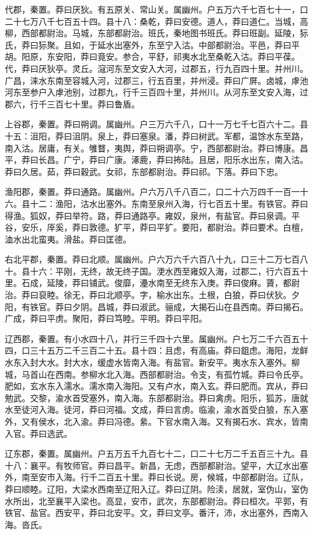 \documentclass[]{article}
\begin{document}
代郡，秦置。莽曰厌狄。有五原关、常山关。属幽州。户五万六千七百七十一，口二十七万八千七百五十四。县十八：桑乾，莽曰安德。道人，莽曰道仁。当城，高柳，西部都尉治。马城，东部都尉治。班氏，秦地图书班氏。莽曰班副。延陵，狋氏，莽曰狋聚。且如，于延水出塞外，东至宁入沽。中部都尉治。平邑，莽曰平胡。阳原，东安阳，莽曰竟安。参合，平舒，祁夷水北至桑乾入沽。莽曰平葆。代，莽曰厌狄亭。灵丘。滱河东至文安入大河，过郡五，行九百四十里。并州川。广昌，涞水东南至容城入河，过郡三，行五百里，并州浸。莽曰广屏。卤城，虖池河东至参户入虖池别，过郡九，行千三百四十里，并州川。从河东至文安入海，过郡六，行千三百七十里。莽曰鲁盾。

上谷郡，秦置。莽曰朔调。属幽州。户三万六千八，口十一万七千七百六十二。县十五：沮阳，莽曰沮阴。泉上，莽曰塞泉。潘，莽曰树武。军都，温馀水东至路，南入沽。居庸，有关。雊瞀，夷舆，莽曰朔调亭。宁，西部都尉治。莽曰博康。昌平，莽曰长昌。广宁，莽曰广康。涿鹿，莽曰抪陆。且居，阳乐水出东，南入沽。莽曰久居。茹，莽曰穀武。女祁，东部都尉治。莽曰祁。下落。莽曰下忠。

渔阳郡，秦置。莽曰通路。属幽州。户六万八千八百二，口二十六万四千一百一十六。县十二：渔阳，沽水出塞外。东南至泉州入海，行七百五十里。有铁官。莽曰得渔。狐奴，莽曰举符。路，莽曰通路亭。雍奴，泉州，有盐官。莽曰泉调。平谷，安乐，厗奚，莽曰敦德。犷平，莽曰平犷。要阳，都尉治。莽曰要术。白檀，洫水出北蛮夷。滑盐。莽曰匡德。

右北平郡，秦置。莽曰北顺。属幽州。户六万六千六百八十九，口三十二万七百八十。县十六：平刚，无终，故无终子国。浭水西至雍奴入海，过郡二，行六百五十里。石成，延陵，莽曰铺武。俊靡，灅水南至无终东入庚。莽曰俊麻。薋，都尉治。莽曰裒睦。徐无，莽曰北顺亭。字，榆水出东。土根，白狼，莽曰伏狄。夕阳，有铁官。莽曰夕阴。昌城，莽曰淑武。骊成，大揭石山在县西南。莽曰揭石。广成，莽曰平虏。聚阳，莽曰笃睦。平明。莽曰平阳。

辽西郡，秦置。有小水四十八，并行三千四十六里。属幽州。户七万二千六百五十四，口三十五万二千三百二十五。县十四：且虑，有高庙。莽曰鉏虑。海阳，龙鲜水东入封大水。封大水，缓虚水皆南入海。有盐官。新安平。夷水东入塞外。柳城，马首山在西南。参柳水北入海。西部都尉治。令支，有孤竹城。莽曰令氏亭。肥如，玄水东入濡水。濡水南入海阳。又有卢水，南入玄。莽曰肥而。宾从，莽曰勉武。交黎，渝水首受塞外，南入海。东部都尉治。莽曰禽虏。阳乐，狐苏，唐就水至徒河入海。徒河，莽曰河福。文成，莽曰言虏。临渝，渝水首受白狼，东入塞外，又有侯水，北入渝。莽曰冯德。絫。下官水南入海。又有揭石水、宾水，皆南入官。莽曰选武。

辽东郡，秦置。属幽州。户五万五千九百七十二，口二十七万二千五百三十九。县十八：襄平。有牧师官。莽曰昌平。新昌，无虑，西部都尉治。望平，大辽水出塞外，南至安市入海。行千二百五十里。莽曰长说。房，候城，中部都尉治。辽队，莽曰顺睦。辽阳，大梁水西南至辽阳入辽。莽曰辽阴。险渎，居就，室伪山，室伪水所出，北至襄平入梁也。高显，安市，武次，东部都尉治。莽曰桓次。平郭，有铁官、盐官。西安平，莽曰北安平。文，莽曰文亭。番汗，沛，水出塞外，西南入海。沓氏。
\end{document}
